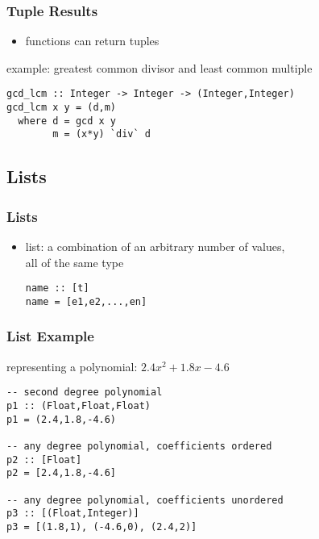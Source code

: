 \documentclass[dvipsnames]{beamer}
\theoremstyle{plain}
\begin{document}
\begin{frame}[fragile]
  \frametitle{Tuple Results}

  \begin{itemize}
    \item functions can return tuples
  \end{itemize}

  \begin{exampleblock}{example: greatest common divisor
                            and least common multiple}
    \begin{lstlisting}
gcd_lcm :: Integer -> Integer -> (Integer,Integer)
gcd_lcm x y = (d,m)
  where d = gcd x y
        m = (x*y) `div` d
    \end{lstlisting}
  \end{exampleblock}
\end{frame}

\subsection{Lists}

\begin{frame}[fragile]
  \frametitle{Lists}

  \begin{itemize}
    \item \alert{list}: a combination of an arbitrary number of values,\\
      all of the same type
    \smallskip
    \begin{lstlisting}
name :: [t]
name = [e1,e2,...,en]
    \end{lstlisting}
  \end{itemize}
\end{frame}

\begin{frame}[fragile]
  \frametitle{List Example}

  \begin{exampleblock}{representing a polynomial: $2.4x^2 + 1.8x - 4.6$}
    \begin{lstlisting}
-- second degree polynomial
p1 :: (Float,Float,Float)
p1 = (2.4,1.8,-4.6)

-- any degree polynomial, coefficients ordered
p2 :: [Float]
p2 = [2.4,1.8,-4.6]

-- any degree polynomial, coefficients unordered
p3 :: [(Float,Integer)]
p3 = [(1.8,1), (-4.6,0), (2.4,2)]
    \end{lstlisting}
  \end{exampleblock}
\end{frame}
\end{document}
